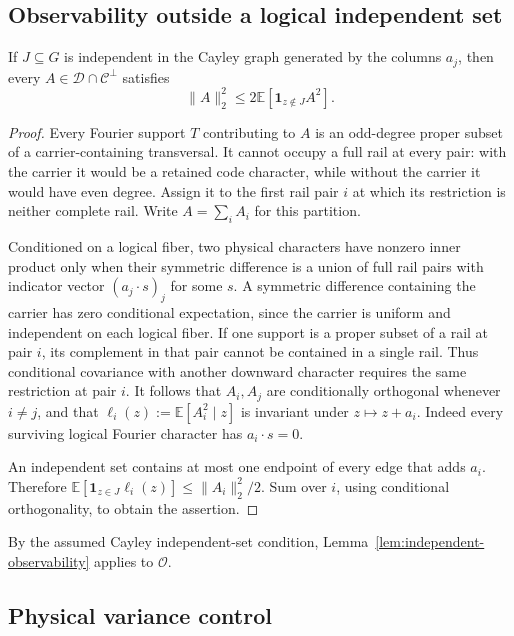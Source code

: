 \subsection{Observability outside a logical independent set}

\begin{lemma}\label{lem:independent-observability}
If $J\subseteq G$ is independent in the Cayley graph generated by
the columns $a_j$,
then every $A\in\mathcal D\cap\mathcal C^\perp$ satisfies
\[
 \|A\|_2^2\le2\mathbb E[\mathbf1_{z\notin J}A^2].
\]
\end{lemma}
\begin{proof}
Every Fourier support $T$ contributing to $A$ is an odd-degree proper
subset of a carrier-containing transversal. It cannot occupy a full
rail at every pair: with the carrier it would be a retained code
character, while without the carrier it would have even degree.
Assign it to the first rail pair $i$ at which its restriction is neither
complete rail. Write $A=\sum_i A_i$ for this partition.

Conditioned on a logical fiber, two physical characters have nonzero
inner product only when their symmetric difference is a union of full
rail pairs with indicator vector $(a_j\cdot s)_j$ for some $s$.
A symmetric difference containing the carrier has zero conditional
expectation, since the carrier is uniform and independent on each
logical fiber. If one support is a proper subset of a rail at pair $i$,
its complement in that pair cannot be contained in a single rail.
Thus conditional covariance with another downward character requires
the same restriction at pair $i$. It follows that $A_i,A_j$ are
conditionally orthogonal whenever $i\ne j$, and that
$\ell_i(z):=\mathbb E[A_i^2\mid z]$ is invariant under $z\mapsto z+a_i$.
Indeed every surviving logical Fourier character has $a_i\cdot s=0$.

An independent set contains at most one endpoint of every edge that
adds $a_i$.
Therefore $\mathbb E[\mathbf1_{z\in J}\ell_i(z)]\le\|A_i\|_2^2/2$.
Sum over $i$, using conditional orthogonality, to obtain the assertion.
\end{proof}

By the assumed Cayley independent-set condition,
Lemma~\ref{lem:independent-observability} applies to $\mathcal O$.

\subsection{Physical variance control}

